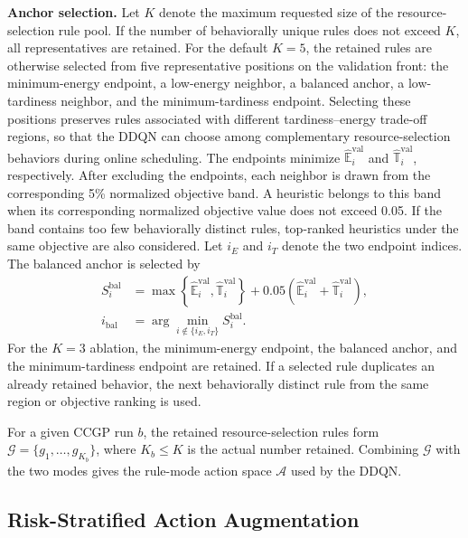 \documentclass[10pt,journal]{IEEEtran}
\begin{document}
\textbf{Anchor selection.} Let $K$ denote the maximum requested size of the resource-selection rule pool. If the number of behaviorally unique rules does not exceed $K$, all representatives are retained. For the default $K=5$, the retained rules are otherwise selected from five representative positions on the validation front: the minimum-energy endpoint, a low-energy neighbor, a balanced anchor, a low-tardiness neighbor, and the minimum-tardiness endpoint. Selecting these positions preserves rules associated with different tardiness--energy trade-off regions, so that the DDQN can choose among complementary resource-selection behaviors during online scheduling. The endpoints minimize $\widehat{\mathbb{E}}_i^{\mathrm{val}}$ and $\widehat{\mathbb{T}}_i^{\mathrm{val}}$, respectively. After excluding the endpoints, each neighbor is drawn from the corresponding 5\% normalized objective band. A heuristic belongs to this band when its corresponding normalized objective value does not exceed 0.05. If the band contains too few behaviorally distinct rules, top-ranked heuristics under the same objective are also considered. Let $i_E$ and $i_T$ denote the two endpoint indices. The balanced anchor is selected by
\begin{equation}
\begin{aligned}
    S_i^{\mathrm{bal}}
    &=\max\left\{
        \widehat{\mathbb{E}}_i^{\mathrm{val}},
        \widehat{\mathbb{T}}_i^{\mathrm{val}}
      \right\}
      +0.05\left(
        \widehat{\mathbb{E}}_i^{\mathrm{val}}+
        \widehat{\mathbb{T}}_i^{\mathrm{val}}
      \right),\\
    i_{\mathrm{bal}}
    &=\arg\min_{i\notin\{i_E,i_T\}} S_i^{\mathrm{bal}}.
\end{aligned}
    \label{Eq: balanced anchor}
\end{equation}
For the $K=3$ ablation, the minimum-energy endpoint, the balanced anchor, and the minimum-tardiness endpoint are retained. If a selected rule duplicates an already retained behavior, the next behaviorally distinct rule from the same region or objective ranking is used.

For a given CCGP run $b$, the retained resource-selection rules form $\mathcal{G}=\{g_1,\ldots,g_{K_b}\}$, where $K_b\leq K$ is the actual number retained. Combining $\mathcal{G}$ with the two modes gives the rule-mode action space $\mathcal{A}$ used by the DDQN.

\subsection{Risk-Stratified Action Augmentation}
\label{Sec: risk stratified actions}
\end{document}
